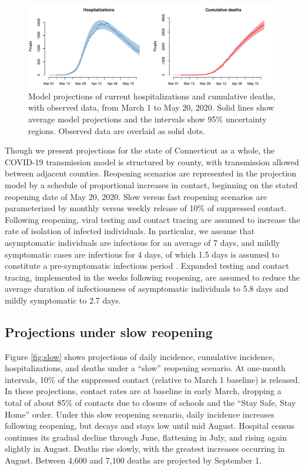 \documentclass[11pt]{article}
\begin{document}
\begin{figure}
\centering
\includegraphics[width=\textwidth]{figures/calibration.pdf}
\caption{Model projections of current hospitalizations and cumulative deaths, with observed data, from March 1 to May 20, 2020. Solid lines show average model projections and the intervals show 95\% uncertainty regions.  Observed data are overlaid as solid dots.} 
\label{fig:calibration}
\end{figure}

Though we present projections for the state of Connecticut as a whole, the COVID-19 transmission model is structured by county, with transmission allowed between adjacent counties. Reopening scenarios are represented in the projection model by a schedule of proportional increases in contact, beginning on the stated reopening date of May 20, 2020. Slow versus fast reopening scenarios are parameterized by monthly versus weekly release of 10\% of suppressed contact.  Following reopening, viral testing and contact tracing are assumed to increase the rate of isolation of infected individuals. In particular, we assume that asymptomatic individuals are infectious for an average of 7 days, and mildly symptomatic cases are infectious for 4 days, of which 1.5 days is assumed to constitute a pre-symptomatic infectious period \citep{li2020substantial, kissler2020projecting, salje2020estimating, wolfel2020virological, wei2020presymptomatic}. Expanded testing and contact tracing, implemented in the weeks following reopening, are assumed to reduce the average duration of infectiousness of asymptomatic individuals to 5.8 days and mildly symptomatic to 2.7 days. 




\subsection*{Projections under slow reopening} 

Figure \ref{fig:slow} shows projections of daily incidence, cumulative incidence, hospitalizations, and deaths under a ``slow'' reopening scenario. At one-month intervals, 10\% of the suppressed contact (relative to March 1 baseline) is released.  In these projections, contact rates are at baseline in early March, dropping a total of about 85\% of contacts due to closure of schools and the ``Stay Safe, Stay Home'' order.  Under this slow reopening scenario, daily incidence increases following reopening, but decays and stays low until mid August.  Hospital census continues its gradual decline through June, flattening in July, and rising again slightly in August. Deaths rise slowly, with the greatest increases occurring in August. Between 4,600 and 7,100 deaths are projected by September 1.  
\end{document}
